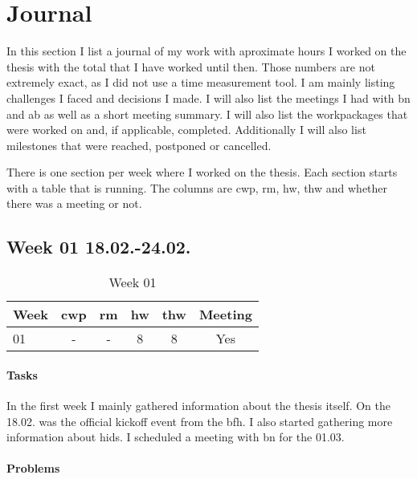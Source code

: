 \chapter{Journal}
\label{sec:journal}

In this section I list a journal of my work with aproximate hours I worked on the thesis with the total that I have worked until then. Those numbers are not extremely exact, as I did not use a time measurement tool. I am mainly listing challenges I faced and decisions I made. I will also list the meetings I had with \gls{bn} and \gls{ab} as well as a short meeting summary. I will also list the workpackages that were worked on and, if applicable, completed. Additionally I will also list milestones that were reached, postponed or cancelled.

There is one section per week where I worked on the thesis. Each section starts with a table that is running. The columns are \gls{cwp}, \gls{rm}, \gls{hw}, \gls{thw} and whether there was a meeting or not.


\section{Week 01 18.02.-24.02.}
\label{sec:journal:week01}

\begin{table}[!ht]
    \begin{center}
        \caption{Week 01}
        \label{tab:journal:week01}
        \begin{tabular}{l|c|c|c|c|c}
            \textbf{Week} & \textbf{\gls{cwp}} & \textbf{\gls{rm}} & \textbf{\gls{hw}} & \textbf{\gls{thw}} & \textbf{Meeting}\\
        \hline
        01 & - & - & 8 & 8 & Yes \\
        \end{tabular}
    \end{center}
\end{table}

\subsubsection{Tasks}

In the first week I mainly gathered information about the thesis itself. On the 18.02. was the official kickoff event from the \gls{bfh}. I also started gathering more information about \gls{hids}. I scheduled a meeting with \gls{bn} for the 01.03.

\subsubsection{Problems}

